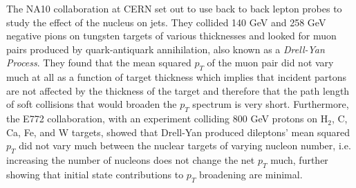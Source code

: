 The NA10 collaboration at CERN set out to use back to back lepton probes to study the effect of the nucleus on jets. They collided 140 GeV and 258 GeV negative pions on tungsten targets of various thicknesses and looked for muon pairs produced by quark-antiquark annihilation, also known as a \textit{Drell-Yan Process}.
They found that the mean squared $p_{T}$ of the muon pair did not vary much at all as a function of target thickness which implies that incident partons are not affected by the thickness of the target and therefore that the path length of soft collisions that would broaden the $p_{T}$ spectrum is very short. Furthermore, the E772 collaboration, with an experiment colliding 800 GeV protons on H$_{2}$, C, Ca, Fe, and W targets, showed that Drell-Yan produced dileptons’ mean squared $p_{T}$ did not vary much between the nuclear targets of varying nucleon number\citep{PhysRevLett.66.2285}, i.e. increasing the number of nucleons does not change the net $p_{T}$ much, further showing that initial state contributions to $p_{T}$ broadening are minimal.

